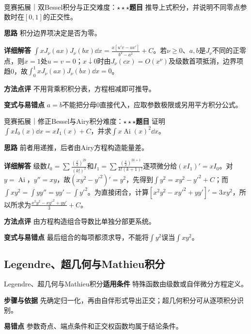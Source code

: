 \begin{example}{竞赛拓展｜双Bessel积分与正交}{难度：$\star\star\star$}\label{deep:ex:integral_special_deep:besselpair}\textbf{题目} 推导上式积分，并说明不同零点参数时在$[0,1]$的正交性。\par\textbf{思路} 积分边界项决定是否为零。\par\textbf{详细解答} $\int xJ_\nu(ax)J_\nu(bx)\dd x=\frac{x[u'v-uv']}{b^2-a^2}+C$。若$\nu\ge0$、$a,b$是$J_\nu$不同的正零点，则$x=1$处$u=v=0$；$x\downarrow0$时由$J_\nu(cx)=O(x^\nu)$及级数首项抵消，边界项趋0，故$\int_0^1xJ_\nu(ax)J_\nu(bx)\dd x=0$。\par\textbf{方法点评} 不用背乘积积分表，方程相减即可推导。\par\textbf{变式与易错点} $a=b$不能把分母0直接代入，应取参数极限或另用平方积分公式。\end{example}

\begin{example}{竞赛拓展｜修正Bessel与Airy积分}{难度：$\star\star\star$}\label{deep:ex:integral_special_deep:modified}\textbf{题目} 证明$\int xI_0(x)\dd x=xI_1(x)+C$，并求$\int x\operatorname{Ai}(x)^2\dd x$。\par\textbf{思路} 前者用递推，后者由Airy方程构造能量差。\par\textbf{详细解答} 级数$I_0=\sum\frac{(\frac{x}{2})^{2k}}{(k!)^2}$和$I_1=\sum\frac{(\frac{x}{2})^{2k+1}}{k!(k+1)!}$逐项微分给$(xI_1)'=xI_0$。对$y=\operatorname{Ai}$，$y''=xy$，故$(xy^2-y'^2)'=y^2$，先得到$\int y^2=xy^2-y'^2+C$；而$\int xy^2=\int yy''=yy'-\int y'^2$。为直接闭合，计算$[x^2y^2-xy'^2+yy']'=3xy^2$，所以所求为$\frac{x^2y^2-xy'^2+yy'}{3}+C$。\par\textbf{方法点评} 由方程构造组合导数比单独分部更系统。\par\textbf{变式与易错点} 最后组合的每项都须求导，不能将$\int y^2$误当$\int xy^2$。\end{example}

\subsection{Legendre、超几何与Mathieu积分}\label{deep:integral_special_deep:orthogonal}

\begin{method}{Legendre、超几何与Mathieu积分}\textbf{适用条件} 特殊函数由级数或自伴微分方程定义。\par\textbf{步骤与依据} 先确定归一化，再由自伴形式导出正交；超几何积分可从逐项积分识别。\par\textbf{易错点} 参数奇点、端点条件和正交权函数均属于结论条件。\end{method}

